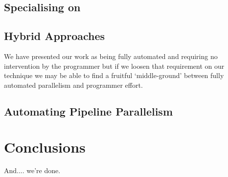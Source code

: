 \documentclass[justified, twoside, a4paper, symmetric]{tufte-book}
\begin{document}
    \section{Specialising on \underline{\hspace{2cm}}}

    \section{Hybrid Approaches}

        We have presented our work as being fully automated and requiring no
        intervention by the programmer but if we loosen that requirement on
        our technique we may be able to find a fruitful `middle-ground' between
        fully automated parallelism and programmer effort.

    \section{Automating Pipeline Parallelism}


\chapter{Conclusions}

    And.... we're done.

\listoftodos[Notes]

\backmatter



\end{document}
